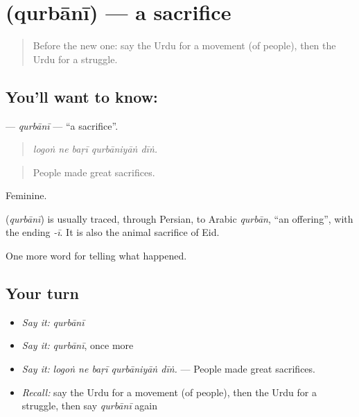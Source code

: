 \section[\texorpdfstring{\ur{قربانی} (qurbānī)}{قربانی (qurbānī)}]{ (qurbānī) — a sacrifice}

\label{lesson:UR-C313-qurbani}



\begin{quote}
Before the new one: say the Urdu for a movement (of people), then the Urdu for a struggle.
\end{quote}

\subsection*{You'll want to know: }
\textbf{} — \emph{qurbānī} — \textquotedblleft{}a sacrifice\textquotedblright{}.

\begin{quote}
    
\end{quote}

\begin{quote}
\emph{logoṅ ne baṛī qurbāniyāṅ dīṅ.}
\end{quote}

\begin{quote}
People made great sacrifices.
\end{quote}

Feminine.

\begin{cousinweb}
\textbf{} (\emph{qurbānī}) is usually traced, through Persian, to Arabic \emph{qurbān}, \textquotedblleft{}an offering\textquotedblright{}, with the ending \emph{-ī}. It is also the animal sacrifice of Eid.
\end{cousinweb}

\begin{grammarlens}[title={What you've built}]
One more word for telling what happened.
\end{grammarlens}

\subsection*{Your turn}
\begin{itemize}
\raggedright
  \item \emph{Say it:} \emph{qurbānī}
  \item \emph{Say it:} \emph{qurbānī}, once more
  \item \emph{Say it:} \emph{logoṅ ne baṛī qurbāniyāṅ dīṅ.} — People made great sacrifices.
  \item \emph{Recall:} say the Urdu for a movement (of people), then the Urdu for a struggle, then say \emph{qurbānī} again
\end{itemize}


